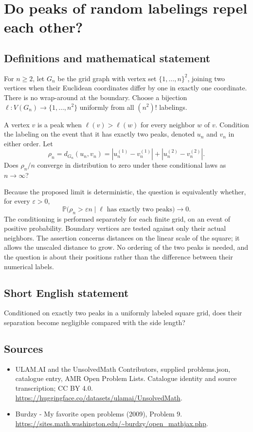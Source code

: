 \documentclass[11pt,a4paper]{article}
\begin{document}
\section*{Do peaks of random labelings repel each other?}\label{statement}

\subsection{Definitions and mathematical statement}
For $n\ge2$, let $G_n$ be the grid graph with vertex set $\{1,\ldots,n\}^2$, joining two vertices when their Euclidean coordinates differ by one in exactly one coordinate. There is no wrap-around at the boundary. Choose a bijection $\ell:V(G_n)\to\{1,\ldots,n^2\}$ uniformly from all $(n^2)!$ labelings.

A vertex $v$ is a peak when $\ell(v)>\ell(w)$ for every neighbor $w$ of $v$. Condition the labeling on the event that it has exactly two peaks, denoted $u_n$ and $v_n$ in either order. Let
\[
\rho_n=d_{G_n}(u_n,v_n)
=|u_n^{(1)}-v_n^{(1)}|+|u_n^{(2)}-v_n^{(2)}|.
\]
Does $\rho_n/n$ converge in distribution to zero under these conditional laws as $n\to\infty$?

Because the proposed limit is deterministic, the question is equivalently whether, for every $\varepsilon>0$,
\[
\mathbb P\bigl(\rho_n>\varepsilon n\mid
\ell\text{ has exactly two peaks}\bigr)\longrightarrow0.
\]
The conditioning is performed separately for each finite grid, on an event of positive probability. Boundary vertices are tested against only their actual neighbors. The assertion concerns distances on the linear scale of the square; it allows the unscaled distance to grow. No ordering of the two peaks is needed, and the question is about their positions rather than the difference between their numerical labels.
\subsection{Short English statement}
Conditioned on exactly two peaks in a uniformly labeled square grid, does their separation become negligible compared with the side length?
\subsection{Sources}
\begin{itemize}
\item[S1] ULAM.AI and the UnsolvedMath Contributors, supplied problems.json, catalogue entry, AMR Open Problem Lists. Catalogue identity and source transcription; CC BY 4.0.
\url{https://huggingface.co/datasets/ulamai/UnsolvedMath}.
\item[S2] Burdzy - My favorite open problems (2009), Problem 9. 
\url{https://sites.math.washington.edu/~burdzy/open_mathjax.php}.
\end{itemize}
\end{document}
